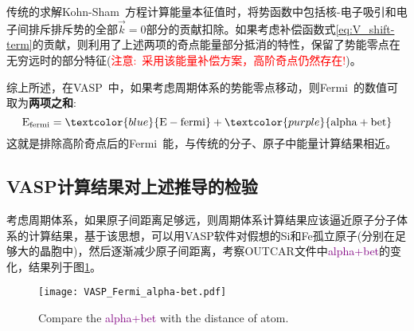 传统的求解\textrm{Kohn-Sham~}方程计算能量本征值时，将势函数中包括核-电子吸引和电子间排斥排斥势的全部$\vec k=0$部分的贡献扣除。如果考虑补偿函数式\eqref{eq:V_shift-term}的贡献，则利用了上述两项的奇点能量部分抵消的特性，保留了势能零点在无穷远时的部分特征(\textcolor{red}{注意:~采用该能量补偿方案，高阶奇点仍然存在!})。

综上所述，在\textrm{VASP~}中，如果考虑周期体系的势能零点移动，则\textrm{Fermi~}的数值可取为\textbf{两项之和}:~
\begin{displaymath}
	\mathrm{E_{fermi}}=\textcolor{blue}{\mathrm{E-fermi}}+\textcolor{purple}{\mathrm{alpha+bet}}
\end{displaymath}
这就是排除高阶奇点后的\textrm{Fermi~}能，与传统的分子、原子中能量计算结果相近。

\subsection{\rm{VASP}计算结果对上述推导的检验}
考虑周期体系，如果原子间距离足够远，则周期体系计算结果应该逼近原子分子体系的计算结果，基于该思想，可以用\textrm{VASP}软件对假想的\textrm{Si}和\textrm{Fe}孤立原子(分别在足够大的晶胞中)，然后逐渐减少原子间距离，考察\textrm{OUTCAR}文件中\textcolor{purple}{\textrm{alpha+bet}}的变化，结果列于图\ref{Fig:VASP_alpha+bet}。
\begin{figure}[h!]
\centering
\hspace*{-0.7in}
\vspace*{-0.2in}
\texttt{[image: VASP\_Fermi\_alpha-bet.pdf]}
\caption{\small Compare the \textcolor{purple}{\textrm{alpha+bet}} with the distance of atom.}%
\label{Fig:VASP_alpha+bet}
\end{figure}

